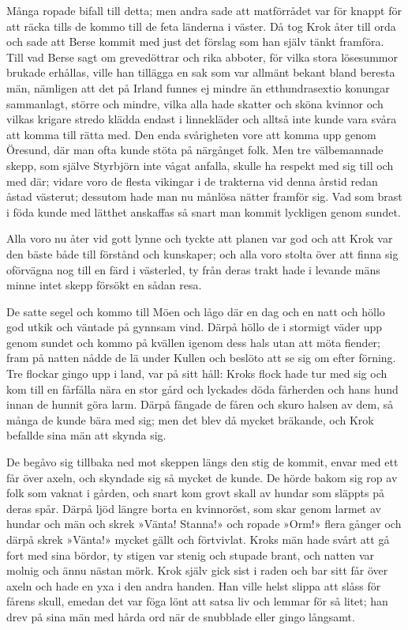 \initial Många ropade bifall till detta; men andra sade att matförrådet var för knappt för att räcka tills de kommo till de feta länderna i väster.
Då tog Krok åter till orda och sade att Berse kommit med just det förslag som han själv tänkt framföra. Till vad Berse sagt om grevedöttrar och rika abboter, för vilka stora lösesummor brukade erhållas, ville han tillägga en sak som var allmänt bekant bland beresta män, nämligen att det på Irland funnes ej mindre än etthundrasextio konungar sammanlagt, större och mindre, vilka alla hade skatter och sköna kvinnor och vilkas krigare stredo klädda endast i linnekläder och alltså inte kunde vara svåra att komma till rätta med. Den enda svårigheten vore att komma upp genom Öresund, där man ofta kunde stöta på närgånget folk. Men tre välbemannade skepp, som själve Styrbjörn inte vågat anfalla, skulle ha respekt med sig till och med där; vidare voro de flesta vikingar i de trakterna vid denna årstid redan åstad västerut; dessutom hade man nu månlösa nätter framför sig. Vad som brast i föda kunde med lätthet anskaffas så snart man kommit lyckligen genom sundet.

\initial Alla voro nu åter vid gott lynne och tyckte att planen var god och att Krok var den bäste både till förstånd och kunskaper; och alla voro stolta över att finna sig oförvägna nog till en färd i västerled, ty från deras trakt hade i levande mäns minne intet skepp försökt en sådan resa.

\initial De satte segel och kommo till Möen och lågo där en dag och en natt och höllo god utkik och väntade på gynnsam vind. Därpå höllo de i stormigt väder upp genom sundet och kommo på kvällen igenom dess hals utan att möta fiender; fram på natten nådde de lä under Kullen och beslöto att se sig om efter förning. Tre flockar gingo upp i land, var på sitt håll: Kroks flock hade tur med sig och kom till en fårfålla nära en stor gård och lyckades döda fårherden och hans hund innan de hunnit göra larm. Därpå fångade de fåren och skuro halsen av dem, så många de kunde bära med sig; men det blev då mycket bräkande, och Krok befallde sina män att skynda sig.

\initial De begåvo sig tillbaka ned mot skeppen längs den stig de kommit, envar med ett får över axeln, och skyndade sig så mycket de kunde. De hörde bakom sig rop av folk som vaknat i gården, och snart kom grovt skall av hundar som släppts på deras spår. Därpå ljöd längre borta en kvinnoröst, som skar genom larmet av hundar och män och skrek »Vänta! Stanna!» och ropade »Orm!» flera gånger och därpå skrek »Vänta!» mycket gällt och förtvivlat. Kroks män hade svårt att gå fort med sina bördor, ty stigen var stenig och stupade brant, och natten var molnig och ännu nästan mörk. Krok själv gick sist i raden och bar sitt får över axeln och hade en yxa i den andra handen. Han ville helst slippa att slåss för fårens skull, emedan det var föga lönt att satsa liv och lemmar för så litet; han drev på sina män med hårda ord när de snubblade eller gingo långsamt.

